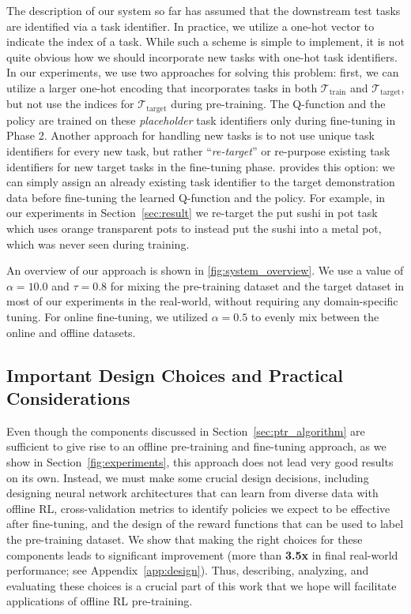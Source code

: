  The description of our system so far has assumed that the downstream test tasks are identified via a task identifier. In practice, we utilize a one-hot vector to indicate the index of a task. While such a scheme is simple to implement, it is not quite obvious how we should incorporate new tasks with one-hot task identifiers. In our experiments, we use two approaches for solving this problem: first, we can utilize a larger one-hot encoding that incorporates tasks in both $\mathcal{T}_\text{train}$ and $\mathcal{T}_\text{target}$, but not use the indices for $\mathcal{T}_\text{target}$ during pre-training. The Q-function and the policy are trained on these \emph{placeholder} task identifiers only during fine-tuning in Phase 2. 
Another approach for handling new tasks is to not use unique task identifiers for every new task, but rather ``\emph{re-target}'' or re-purpose existing task identifiers for new target tasks in the fine-tuning phase. \ptrmethodname provides this option: we can simply assign an already existing task identifier to the target demonstration data before fine-tuning the learned Q-function and the policy. For example, in our experiments in Section~\ref{sec:result} we re-target the put sushi in pot task which uses orange transparent pots to instead put the sushi into a metal pot, which was never seen during training.

An overview of our approach is shown in \autoref{fig:system_overview}. We use a value of $\alpha=10.0$ and $\tau=0.8$ for mixing the pre-training dataset and the target dataset in most of our experiments in the real-world, without requiring any domain-specific tuning. For online fine-tuning, we utilized $\alpha=0.5$ to evenly mix between the online and offline datasets. 

\vspace{-0.2cm}
\subsection{Important Design Choices and Practical Considerations}
\label{sec:design_choices}
\vspace{-0.2cm}
Even though the components discussed in Section~\ref{sec:ptr_algorithm} are sufficient to give rise to an offline pre-training and fine-tuning approach, as we show in Section~\ref{fig:experiments}, this approach does not lead very good results on its own. Instead, we must make some crucial design decisions, including designing  neural network architectures that can learn from diverse data with offline RL,
cross-validation metrics to identify policies we expect to be effective after fine-tuning, and the design of the reward functions that can be used to label the pre-training dataset. {We show that making the right choices for these components leads to significant improvement (more than \textbf{3.5x} in final real-world performance; see Appendix~\ref{app:design}). Thus, describing, analyzing, and evaluating these choices is a crucial part of this work that we hope will facilitate applications of offline RL pre-training.}


